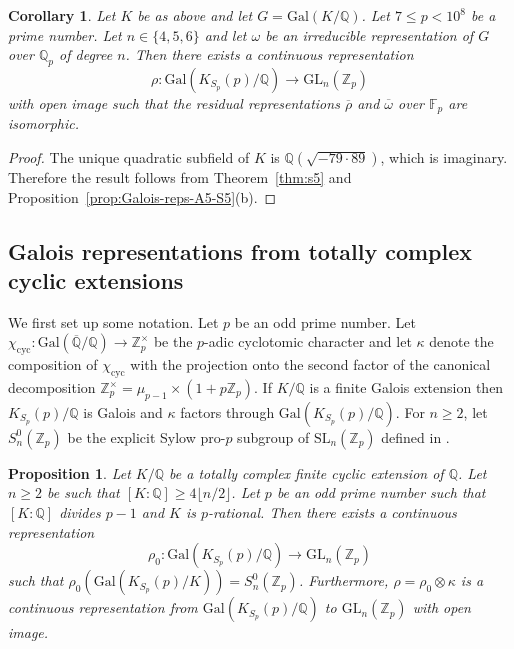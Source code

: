 \documentclass[12pt, a4paper, usenames]{amsart}
\newcommand{\Z}{\mathbb{Z}}
\newcommand{\Q}{\mathbb{Q}}
\newcommand{\F}{\mathbb{F}}
\theoremstyle{plain}
\newtheorem{corollary}[theorem]{Corollary}
\newtheorem{prop}[theorem]{Proposition}
\theoremstyle{remark}
\theoremstyle{definition}
\newcommand{\Gal}{\mathrm{Gal}}
\begin{document}
\begin{corollary}
Let $K$ be as above and let $G=\Gal(K/\Q)$.
Let $7 \leq p < 10^{8}$ be a prime number. 
Let $n \in \{4,5,6\}$ and let $\omega$ be an irreducible representation of $G$ over 
$\Q_{p}$ of degree $n$.
Then there exists a continuous representation
\[
\rho : \Gal(K_{S_{p}}(p)/\Q) \longrightarrow \mathrm{GL}_{n}(\Z_{p})
\]
with open image such that the residual representations $\overline{\rho}$ 
and $\overline{\omega}$ over $\F_{p}$ are isomorphic.
\end{corollary}

\begin{proof}
The unique quadratic subfield of $K$ is $\Q(\sqrt{-79 \cdot 89})$, which is imaginary.
Therefore the result follows from Theorem~\ref{thm:s5} and 
Proposition~\ref{prop:Galois-reps-A5-S5}(b).
\end{proof}


\subsection{Galois representations from totally complex cyclic extensions}
We first set up some notation. Let $p$ be an odd prime number. 
Let $\chi_{\mathrm{cyc}} : \Gal(\overline{\Q}/\Q) \longrightarrow \Z_{p}^{\times}$ be the $p$-adic cyclotomic character and let $\kappa$ denote the composition of $\chi_{\mathrm{cyc}}$ with the projection onto the second factor of the canonical decomposition $\Z_{p}^{\times} = \mu_{p-1} \times (1+p\Z_{p})$.
If $K/\Q$ is a finite Galois extension then $K_{S_{p}}(p)/\Q$ is Galois and 
$\kappa$ factors through $\Gal(K_{S_{p}}(p)/\Q)$.
For $n \geq 2$, let $S_{n}^{0}(\Z_{p})$ be the explicit Sylow pro-$p$ subgroup
of $\mathrm{SL}_{n}(\Z_{p})$ defined in \cite[\S 5.4]{MR3512524}.

\begin{prop}\label{prop:tot-complex-cyclic}
Let $K/\Q$ be a totally complex finite cyclic extension of $\Q$.
Let $n \geq 2$ be such that $[K:\Q] \geq 4 \lfloor n/2 \rfloor$.
Let $p$ be an odd prime number such that $[K:\Q]$ divides $p-1$ and $K$ is $p$-rational. 
Then there exists a continuous representation
\[
\rho_{0} : \Gal(K_{S_{p}}(p)/\Q) \longrightarrow \mathrm{GL}_{n}(\Z_{p})
\]
such that $\rho_{0}(\Gal(K_{S_{p}}(p)/K)) = S_{n}^{0}(\Z_{p})$.
Furthermore, $\rho = \rho_{0} \otimes \kappa$ is a continuous representation from
$\Gal(K_{S_{p}}(p)/\Q)$ to $\mathrm{GL}_{n}(\Z_{p})$ with open image. 
\end{prop}
\end{document}

